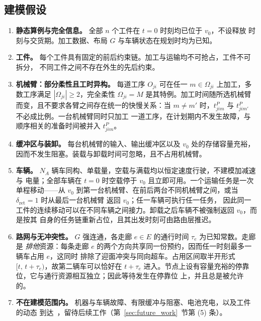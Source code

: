 \documentclass[manuscript,screen,review]{acmart}
\begin{document}
\subsection{建模假设}
\label{sec:assumptions}

\begin{enumerate}[label=\textbf{A\arabic*.},leftmargin=*,topsep=2pt,itemsep=2pt]
\item \textbf{静态算例与完全信息。} 全部 $n$ 个工件在 $t=0$ 时刻均已位于 $v_0$，不设释放
时刻与交货期。加工数据、布局 $G$ 与车辆状态在规划时均为已知。

\item \textbf{工件。} 每个工件具有固定的前后约束链。加工与运输均不可抢占，工件不可拆分，
不同工件之间不存在外生的先后约束。

\item \textbf{机械臂：部分柔性且工时异构。} 每道工序 $O_{ji}$ 可在任一
$m\in\Omega_{ji}$ 上加工，多数工序满足 $|\Omega_{ji}|\ge 2$，完全柔性
$\Omega_{ji}=M$ 是其特例。加工时间随所选机械臂而变，且不要求各臂之间存在统一的快慢关系：当
$m\neq m'$ 时，$t^P_{jim}$ 与 $t^P_{jim'}$ 不必成比例。一台机械臂同时只加工
一道工序，在计划期内不发生故障，与顺序相关的准备时间被并入 $t^P_{jim}$。

\item \textbf{缓冲区与装卸。} 每台机械臂的输入、输出缓冲区以及 $v_0$ 处的存储容量充裕，
因而不发生阻塞。装载与卸载时间可忽略，且不占用机械臂。

\item \textbf{车辆。} $N_A$ 辆车同构、单载量，空载与满载均以恒定速度行驶，不建模加减速与
电量；全部车辆在 $t=0$ 时空载停于 $v_0$ 且立即可用。一个运输任务是一次单程移动——从 $v_0$
到第一台机械臂、在前后两台不同机械臂之间，或当 $\delta_{\mathrm{ret}}=1$ 时从最后一台机械臂
返回 $v_0$；任一车辆可执行任一任务，
因此同一工件的连续移动可以在不同车辆之间接力。卸载之后车辆不被强制返回 $v_0$，而是按其
自身的任务链重新占位，且其出发时刻可由路由层推迟。

\item \textbf{路网与无冲突性。} $G$ 强连通，各走廊 $e\in E$ 的通行时间 $\tau_e$ 为已知常数。走廊是
\emph{排他}资源：每条走廊 $e$ 的两个方向共享同一份预约，因而任一时刻最多一辆车占用 $e$，这同时
排除了迎面冲突与同向超车。占用区间取半开形式 $[t,\,t+\tau_e)$，故第二辆车可以恰好在
$t+\tau_e$ 进入。节点上设有容量充裕的停靠位，它与通行资源相互独立；因此等待发生在停靠位
上，并且总是被允许的。

\item \textbf{不在建模范围内。} 机器与车辆故障、有限缓冲与阻塞、电池充电，以及工件的动态
到达~\cite{gui2023dynamic,zhao2026deep}，留待后续工作（第~\ref{sec:future_work}~节第 (5) 条）。
\end{enumerate}
\end{document}
